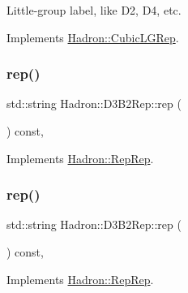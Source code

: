 Little-\/group label, like D2, D4, etc. 

Implements \mbox{\hyperlink{structHadron_1_1CubicLGRep_a9bdb14b519a611d21379ed96a3a9eb41}{Hadron\+::\+Cubic\+L\+G\+Rep}}.

\mbox{\label{structHadron_1_1D3B2Rep_abcd797a15df29cb4a68037442daaf3d5}} 
\subsubsection{\texorpdfstring{rep()}{rep()}\hspace{0.1cm}{\footnotesize\ttfamily [1/5]}}
{\footnotesize\ttfamily std\+::string Hadron\+::\+D3\+B2\+Rep\+::rep (\begin{DoxyParamCaption}{ }\end{DoxyParamCaption}) const\hspace{0.3cm}{\ttfamily [inline]}, {\ttfamily [virtual]}}



Implements \mbox{\hyperlink{structHadron_1_1RepRep_ab3213025f6de249f7095892109575fde}{Hadron\+::\+Rep\+Rep}}.

\mbox{\label{structHadron_1_1D3B2Rep_abcd797a15df29cb4a68037442daaf3d5}} 
\subsubsection{\texorpdfstring{rep()}{rep()}\hspace{0.1cm}{\footnotesize\ttfamily [2/5]}}
{\footnotesize\ttfamily std\+::string Hadron\+::\+D3\+B2\+Rep\+::rep (\begin{DoxyParamCaption}{ }\end{DoxyParamCaption}) const\hspace{0.3cm}{\ttfamily [inline]}, {\ttfamily [virtual]}}



Implements \mbox{\hyperlink{structHadron_1_1RepRep_ab3213025f6de249f7095892109575fde}{Hadron\+::\+Rep\+Rep}}.

\mbox{\label{structHadron_1_1D3B2Rep_abcd797a15df29cb4a68037442daaf3d5}} 
